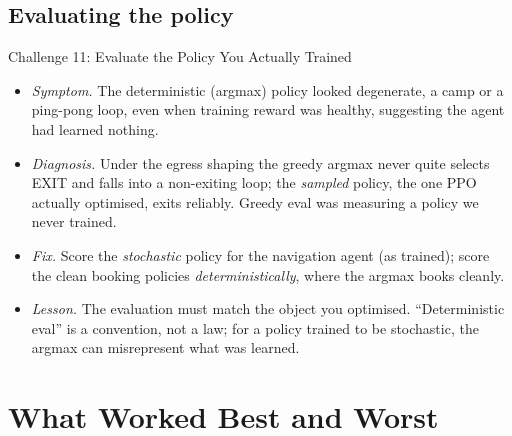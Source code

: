 \documentclass[aspectratio=169, 11pt]{beamer}
\newcommand{\good}[1]{\textcolor{safegreen}{#1}}
\newcommand{\bad}[1]{\textcolor{crowdred}{#1}}
\newcommand{\warn}[1]{\textcolor{warnorange}{#1}}
\newcommand{\emp}[1]{\textit{#1}}
\newcommand{\sdfl}[4]{%
\begin{itemize}\setlength\itemsep{2pt}
\item[\bad{\textbf{S}}] \emp{Symptom.} #1
\item[\warn{\textbf{D}}] \emp{Diagnosis.} #2
\item[\good{\textbf{F}}] \emp{Fix.} #3
\item[\textbf{L}] \emp{Lesson.} #4
\end{itemize}}
\begin{document}
\subsection*{Evaluating the policy}

\begin{frame}{Challenge 11: Evaluate the Policy You Actually Trained}
\footnotesize
\sdfl
{The deterministic (argmax) policy looked degenerate, a camp or a ping-pong loop, even
when training reward was healthy, suggesting the agent had learned nothing.}
{Under the egress shaping the greedy argmax never quite selects EXIT and falls into a
non-exiting loop; the \emp{sampled} policy, the one PPO actually optimised, exits
reliably. Greedy eval was measuring a policy we never trained.}
{Score the \emp{stochastic} policy for the navigation agent (as trained); score the
clean booking policies \emp{deterministically}, where the argmax books cleanly.}
{The evaluation must match the object you optimised. ``Deterministic eval'' is a
convention, not a law; for a policy trained to be stochastic, the argmax can
misrepresent what was learned.}
\end{frame}

\section{What Worked Best and Worst}
\end{document}
